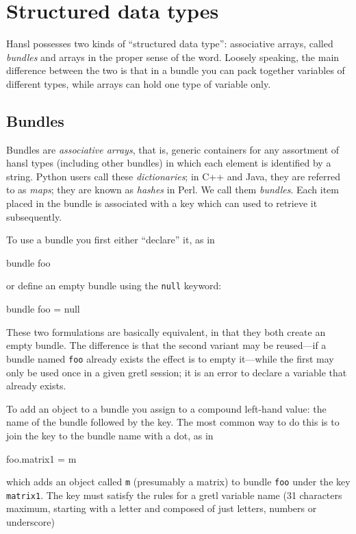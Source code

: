 \chapter{Structured data types}
\label{chap:structypes}

Hansl possesses two kinds of ``structured data type'': associative
arrays, called \emph{bundles} and arrays in the proper sense of the
word. Loosely speaking, the main difference between the two is that in
a bundle you can pack together variables of different types, while
arrays can hold one type of variable only.

\section{Bundles}
\label{chap:bundles}

Bundles are \emph{associative arrays}, that is, generic containers for
any assortment of hansl types (including other bundles) in which each
element is identified by a string. Python users call these
\emph{dictionaries}; in C++ and Java, they are referred to as
\emph{maps}; they are known as \emph{hashes} in Perl. We call them
\emph{bundles}. Each item placed in the bundle is associated with a
key which can used to retrieve it subsequently.

To use a bundle you first either ``declare'' it, as in
%
\begin{code}
bundle foo
\end{code}
%
or define an empty bundle using the \texttt{null} keyword:
%
\begin{code}
bundle foo = null
\end{code}
%
These two formulations are basically equivalent, in that they both
create an empty bundle. The difference is that the second variant may
be reused---if a bundle named \texttt{foo} already exists the effect
is to empty it---while the first may only be used once in a given
gretl session; it is an error to declare a variable that already
exists.

To add an object to a bundle you assign to a compound left-hand value:
the name of the bundle followed by the key. The most common way to do
this is to join the key to the bundle name with a dot, as in
\begin{code}
  foo.matrix1 = m
\end{code}
which adds an object called \texttt{m} (presumably a matrix) to bundle
\texttt{foo} under the key \texttt{matrix1}. The key must satisfy the
rules for a gretl variable name (31 characters maximum, starting
with a letter and composed of just letters, numbers or underscore)

